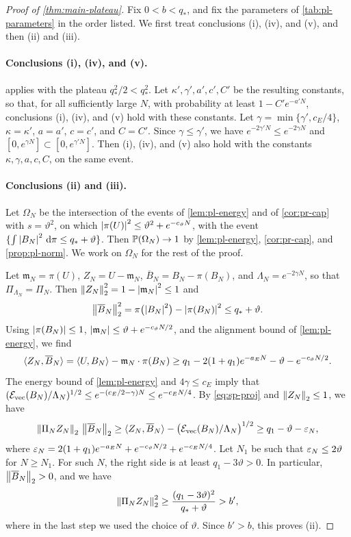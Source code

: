 \begin{proof}[Proof of \cref{thm:main-plateau}]
Fix $0<b<q_*$, and fix the parameters of \cref{tab:pl-parameters} in the order listed. We first treat conclusions (i), (iv), and (v), and then (ii) and (iii).

\paragraph{Conclusions (i), (iv), and (v).}
 applies with the plateau $q_*^2/2<q_*^2$. Let $\kappa',\gamma',a',c',C'$ be the resulting constants, so that, for all sufficiently large $N$, with probability at least $1-C'e^{-a'N}$, conclusions (i), (iv), and (v) hold with these constants. Let $\gamma=\min\{\gamma',c_E/4\}$, $\kappa=\kappa'$, $a=a'$, $c=c'$, and $C=C'$. Since $\gamma\le\gamma'$, we have $e^{-2\gamma'N}\le e^{-2\gamma N}$ and $[0,e^{\gamma N}]\subset[0,e^{\gamma'N}]$. Then (i), (iv), and (v) also hold with the constants $\kappa,\gamma,a,c,C$, on the same event.

\paragraph{Conclusions (ii) and (iii).}
Let $\Omega_N$ be the intersection of the events of \cref{lem:pl-energy} and of \cref{cor:pr-cap} with $s=\vartheta^2$, on which $\left|\pi(U)\right|^2\le\vartheta^2+e^{-c_\vartheta N}$, with the event $\{\int\left|B_N\right|^2\,\mathrm d\pi\le q_*+\vartheta\}$. Then $\mathbb P(\Omega_N)\to1$ by \cref{lem:pl-energy}, \cref{cor:pr-cap}, and \cref{prop:pl-norm}. We work on $\Omega_N$ for the rest of the proof.

Let $\mathfrak m_N=\pi(U)$, $Z_N=U-\mathfrak m_N$, $\overline B_N=B_N-\pi(B_N)$, and $\Lambda_N=e^{-2\gamma N}$, so that $\Pi_{\Lambda_N}=\Pi_N$. Then $\left\lVert Z_N\right\rVert_2^2=1-\left|\mathfrak m_N\right|^2\le1$ and
\[
\left\lVert\overline B_N\right\rVert_2^2=\pi\bigl(\left|B_N\right|^2\bigr)-\left|\pi(B_N)\right|^2\le q_*+\vartheta .
\]
Using $\left|\pi(B_N)\right|\le1$, $\left|\mathfrak m_N\right|\le\vartheta+e^{-c_\vartheta N/2}$, and the alignment bound of \cref{lem:pl-energy}, we find
\[
\langle Z_N,\overline B_N\rangle=\langle U,B_N\rangle-\mathfrak m_N\cdot\pi(B_N)\ge q_1-2(1+q_1)e^{-a_EN}-\vartheta-e^{-c_\vartheta N/2}.
\]
The energy bound of \cref{lem:pl-energy} and $4\gamma\le c_E$ imply that $(\mathcal E_{\rm vec}(B_N)/\Lambda_N)^{1/2}\le e^{-(c_E/2-\gamma)N}\le e^{-c_EN/4}$. By \eqref{eq:sp-proj} and $\left\lVert Z_N\right\rVert_2\le1$, we have
\[
\left\lVert\Pi_NZ_N\right\rVert_2\,\left\lVert\overline B_N\right\rVert_2\ge\langle Z_N,\overline B_N\rangle-\bigl(\mathcal E_{\rm vec}(B_N)/\Lambda_N\bigr)^{1/2}\ge q_1-\vartheta-\varepsilon_N,
\]
where $\varepsilon_N=2(1+q_1)e^{-a_EN}+e^{-c_\vartheta N/2}+e^{-c_EN/4}$. Let $N_1$ be such that $\varepsilon_N\le2\vartheta$ for $N\ge N_1$. For such $N$, the right side is at least $q_1-3\vartheta>0$. In particular, $\left\lVert\overline B_N\right\rVert_2>0$, and we have
\[
\left\lVert\Pi_NZ_N\right\rVert_2^2\ge\frac{(q_1-3\vartheta)^2}{q_*+\vartheta}>b',
\]
where in the last step we used the choice of $\vartheta$. Since $b'>b$, this proves (ii).


\end{proof}
